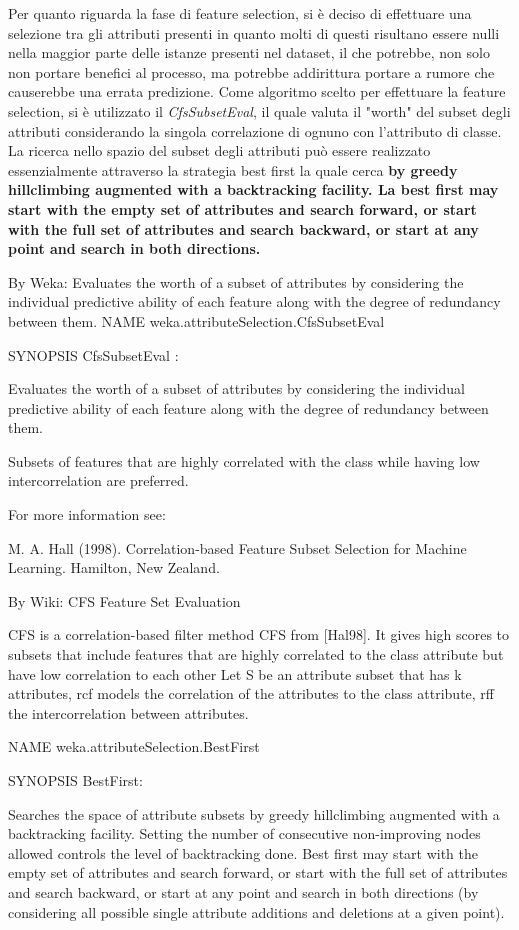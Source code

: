 Per quanto riguarda la fase di feature selection, si è deciso di effettuare una selezione tra gli attributi presenti in quanto molti di questi risultano essere nulli nella maggior parte delle istanze presenti nel dataset, il che potrebbe, non solo non portare benefici al processo, ma potrebbe addirittura portare a rumore che causerebbe una errata predizione.
Come algoritmo scelto per effettuare la feature selection, si è utilizzato il \textit{CfsSubsetEval}, il quale valuta il "worth" del subset degli attributi considerando la singola correlazione di ognuno con l'attributo di classe. La ricerca nello spazio del subset degli attributi può essere realizzato essenzialmente attraverso la strategia best first la quale cerca \textbf{by greedy hillclimbing augmented with a backtracking facility.
La best first may start with the empty set of attributes and search forward, or start with the full set of attributes and search backward, or start at any point and search in both directions.}

By Weka:
Evaluates the worth of a subset of attributes by considering the individual predictive ability of each feature along with the degree of redundancy between them.
NAME
weka.attributeSelection.CfsSubsetEval

SYNOPSIS
CfsSubsetEval :

Evaluates the worth of a subset of attributes by considering the individual predictive ability of each feature along with the degree of redundancy between them.

Subsets of features that are highly correlated with the class while having low intercorrelation are preferred.

For more information see:

M. A. Hall (1998). Correlation-based Feature Subset Selection for Machine Learning. Hamilton, New Zealand.


By Wiki:
CFS Feature Set Evaluation

CFS is a correlation-based filter method CFS from [Hal98]. It gives high scores to subsets that include features
that are highly correlated to the class attribute but have low correlation to each other Let S be an attribute
subset that has k attributes, rcf models the correlation of the attributes to the class attribute, rff the
intercorrelation between attributes.


NAME
weka.attributeSelection.BestFirst

SYNOPSIS
BestFirst:

Searches the space of attribute subsets by greedy hillclimbing augmented with a backtracking facility. Setting the number of consecutive non-improving nodes allowed controls the level of backtracking done. Best first may start with the empty set of attributes and search forward, or start with the full set of attributes and search backward, or start at any point and search in both directions (by considering all possible single attribute additions and deletions at a given point).


